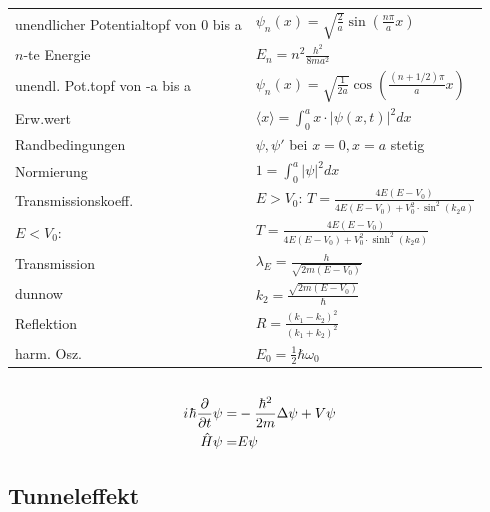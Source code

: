 \documentclass[12pt,a4paper]{article}
\newcommand{\iu}{{i\mkern1mu}}
\newcommand{\abs}[1]{\left| #1 \right|}
\newcommand{\pd}[2]{\frac{\partial #1}{\partial #2}}
\renewcommand{\=}[1]{\stackrel{#1}{=}}
\theoremstyle{definition}
\theoremstyle{remark}
\begin{document}
\begin{center}
\begin{minipage}[t]{.35\linewidth}
\vspace{0pt}
\noindent\begin{tabular}{ll}
\toprule

unendlicher Potentialtopf von 0 bis a & $\psi_n(x) = \sqrt{\frac{2}{a}} \sin (\frac{n \pi}{a}x)$\\
$n$-te Energie &  $E_n = n^2 \frac{h^2}{8ma^2}$\\
unendl. Pot.topf von -a bis a &  $\psi_n(x) = \sqrt{\frac{1}{2a}} \cos (\frac{(n+1/2) \pi}{a}x)$\\
Erw.wert &  $\langle x \rangle = \int_0^a x \cdot \abs{\psi(x,t)}^2 dx$\\
Randbedingungen &  $\psi, \psi'$ bei $x=0, x=a$ stetig\\
Normierung &  $1 = \int_0^a \abs{\psi}^2 dx$\\
Transmissionskoeff. &  $E>V_0$: $T = \frac{4E(E-V_0)}{4E(E-V_0)+V_0^2 \cdot \sin^2 (k_2 a)}$\\
$E<V_0$: & $T = \frac{4E(E-V_0)}{4E(E-V_0)+V_0^2 \cdot \sinh^2 (k_2 a)}$\\
Transmission &  $\lambda_E = \frac{h}{\sqrt{2m(E-V_0)}}$\\
dunnow & $k_2 = \frac{\sqrt{2m(E-V_0)}}{\hbar}$\\
Reflektion & $R = \frac{(k_1-k_2)^2}{(k_1 + k_2)^2}$\\
harm. Osz. & $E_0 = \frac{1}{2} \hbar \omega_0$\\
\bottomrule
\end{tabular}
\end{minipage}%
\begin{minipage}[t]{.65\linewidth}
\vspace{0pt}
\begin{tabular}{ll}
\toprule


\end{tabular}
\end{minipage}
\end{center}


\begin{framed}
\begin{align*}
\iu \hbar \pd{}{t} \psi =& - \frac{\hbar^2}{2m} \Delta \psi + V  \psi\\
\hat H \psi =& E \psi
\end{align*}
\end{framed}


\subsection{Tunneleffekt}
\end{document}
